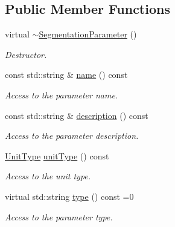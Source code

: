 \subsection*{Public Member Functions}
\begin{DoxyCompactItemize}
\item 
virtual \hyperlink{class_d_d4hep_1_1_d_d_segmentation_1_1_segmentation_parameter_a3969aaa62788ba8e9c5fe9f1ce60fe98}{$\sim$SegmentationParameter} ()
\begin{DoxyCompactList}\small\item\em Destructor. \item\end{DoxyCompactList}\item 
const std::string \& \hyperlink{class_d_d4hep_1_1_d_d_segmentation_1_1_segmentation_parameter_a254647e2a7cb362a8257c378fd85422c}{name} () const 
\begin{DoxyCompactList}\small\item\em Access to the parameter name. \item\end{DoxyCompactList}\item 
const std::string \& \hyperlink{class_d_d4hep_1_1_d_d_segmentation_1_1_segmentation_parameter_a0aca8833764992b4418728ec7c75b421}{description} () const 
\begin{DoxyCompactList}\small\item\em Access to the parameter description. \item\end{DoxyCompactList}\item 
\hyperlink{class_d_d4hep_1_1_d_d_segmentation_1_1_segmentation_parameter_a36f5f8b8d812b2a2b81363377565d8d4}{UnitType} \hyperlink{class_d_d4hep_1_1_d_d_segmentation_1_1_segmentation_parameter_affe99079b9d688d69aefe475cfbc1f39}{unitType} () const 
\begin{DoxyCompactList}\small\item\em Access to the unit type. \item\end{DoxyCompactList}\item 
virtual std::string \hyperlink{class_d_d4hep_1_1_d_d_segmentation_1_1_segmentation_parameter_a761f142a3d6d7ecdbc200e97913af165}{type} () const =0
\begin{DoxyCompactList}\small\item\em Access to the parameter type. \item\end{DoxyCompactList}\item 

\end{DoxyCompactItemize}
